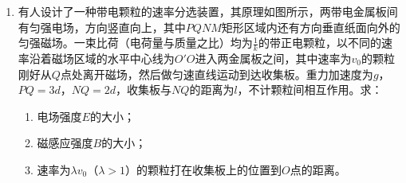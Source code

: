 \documentclass[\gkver]{gaokaozhenti}
\begin{document}
\begin{enumerate}
{橡胶片与地面之间的动摩擦因数：$\mu=\frac{mgL\cos\theta}{Fs}$
}

\item
有人设计了一种带电颗粒的速率分选装置，其原理如图所示，两带电金属板间有匀强电场，方向竖直向上，其中$PQNM$矩形区域内还有方向垂直纸面向外的匀强磁场。一束比荷（电荷量与质量之比）均为$\frac{1}{k}$的带正电颗粒，以不同的速率沿着磁场区域的水平中心线为$O'O$进入两金属板之间，其中速率为$v_{0}$的颗粒刚好从$Q$点处离开磁场，然后做匀速直线运动到达收集板。重力加速度为$g$，$PQ=3d$，$NQ=2d$，收集板与$NQ$的距离为$l$，不计颗粒间相互作用。求：
\begin{enumerate}
	\item
	电场强度$E$的大小；
	\item
	磁感应强度$B$的大小；
	\item
	速率为$\lambda v_{0}$（$\lambda>1$）的颗粒打在收集板上的位置到$O$点的距离。
\end{enumerate}
\end{enumerate}
\end{document}
